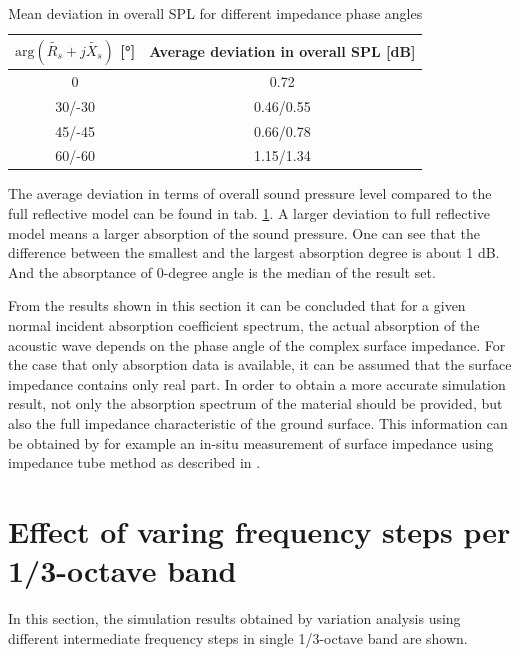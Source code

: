 \begin{table}[H]
	\centering
	\caption{Mean deviation in overall SPL for different impedance phase angles}
	\label{tab:mean_devaition_impedance}
	\begin{tabular}{|c|c|}
		\hline
		$\text{arg}(\tilde{R_s} + j\tilde{X_s})$ [°] & Average deviation in overall SPL {[}dB{]} \\ \hline
		0                         & 0.72                                      \\ \hline
		30/-30                    & 0.46/0.55                                 \\ \hline
		45/-45                    & 0.66/0.78                                 \\ \hline
		60/-60                    & 1.15/1.34                                 \\ \hline
	\end{tabular}
\end{table}

The average deviation in terms of overall sound pressure level compared to the full reflective model can be found in tab. \ref{tab:mean_devaition_impedance}. A larger deviation to full reflective model means a larger absorption of the sound pressure. One can see that the difference between the smallest and the largest absorption degree is about 1 dB. And the absorptance of 0-degree angle is the median of the result set.

From the results shown in this section it can be concluded that for a given normal incident absorption coefficient spectrum, the actual absorption of the acoustic wave depends on the phase angle of the complex surface impedance. For the case that only absorption data is available, it can be assumed that the surface impedance contains only real part. In order to obtain a more accurate simulation result, not only the absorption spectrum of the material should be provided, but also the full impedance characteristic of the ground surface. This information can be obtained by for example an in-situ measurement of surface impedance using impedance tube method as described in \cite{hald_situ_2019, wolkesson_2013}.

\section{Effect of varing frequency steps per 1/3-octave band}

In this section, the simulation results obtained by variation analysis using different intermediate frequency steps in single 1/3-octave band are shown.

